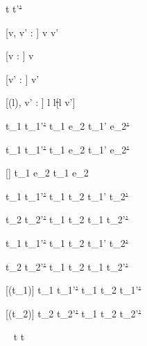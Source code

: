 




  {t\st{}  t'\st{'}}


[v, v' : \beta]
  { }
  {\Edit v\st{}  \Edit v'\st{}}

[v : \beta]
  { }
  {\Edit v\st{} \handle{\Empty} \Enter \beta\st{}}

[v' : \beta]
  { }
  {\Enter \beta\st{}  \Edit v'\st{}}

[\Sigma(l), v' : \beta]
  { }
  {\Update l\st{}  \Update l\st[l \mapsto v']{}}


  { }
  {\Fail\st{}  \Fail\st{}}


  {t_1\st{}  t_1'\st{'}}
  {t_1 \Then e_2\st{}  t_1' \Then e_2\st{'}}

  {t_1\st{}  t_1'\st{'}}
  {t_1 \Next e_2\st{}  t_1' \Next e_2\st{'}}

[\neq \bot \wedge \neg{}]
  { }
  {t_1 \Next e_2\st{} \handle{\Continue} t_1 \Then e_2\st{}}


  {t_1\st{}  t_1'\st{'} }
  {t_1 \And t_2\st{}  t_1' \And t_2\st{'}}

  {t_2\st{}  t_2'\st{'} }
  {t_1\st{} \And t_2  t_1 \And t_2'\st{'}}


  {t_1\st{}  t_1'\st{'} }
  {t_1 \Or t_2\st{}  t_1' \Or t_2\st{'}}

  {t_2\st{}  t_2'\st{'} }
  {t_1 \Or t_2\st{}  t_1 \Or t_2'\st{'}}


[\Failing(t_1)]
  {t_1\st{}  t_1'\st{'}}
  {t_1 \Xor t_2\st{}  t_1'\st{'}}

[\Failing(t_2)]
  {t_2\st{}  t_2'\st{'}}
  {t_1 \Xor t_2\st{}  t_2'\st{'}}

  {\ }
  {t\st{} \handle{\Pick \Here} t\st{}}



